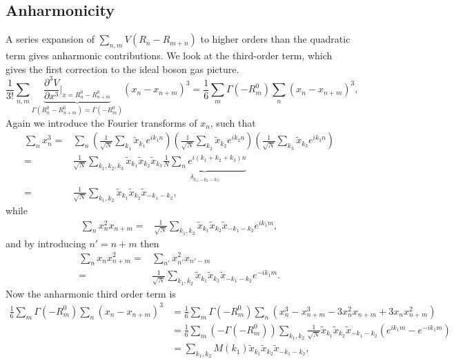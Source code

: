 \subsection{Anharmonicity}
A series expansion of $\sum_{n,m}V(R_{n}-R_{m+n})$ to higher orders than the quadratic term gives anharmonic contributions. We look at the third-order term, which gives the first correction to the ideal boson gas picture.
\[\frac{1}{3!}\sum_{n,m}\underbrace{\frac{\partial^{3}V}{\partial x^{3}}\Bigg|_{x=R_{n}^{0}-R_{n+m}^{0}}}_{\Gamma(R_{n}^{0}-R_{n+m}^{0})=\Gamma(-R_{m}^{0})}\left(x_{n}-x_{n+m}\right)^{3}=\frac{1}{6}\sum_{m}\Gamma(-R_{m}^{0})\sum_{n}\left(x_{n}-x_{n+m}\right)^{3},\]
Again we introduce the Fourier transforms of $x_{n}$, such that
\begin{align}
	\sum_{n}x_{n}^{3}=&\sum_{n}\left(\frac{1}{\sqrt{N}}\sum_{k_{1}}\tilde{x}_{k_{1}}e^{ik_{1}n}\right)\left(\frac{1}{\sqrt{N}}\sum_{k_{2}}\tilde{x}_{k_{2}}e^{ik_{2}n}\right)\left(\frac{1}{\sqrt{N}}\sum_{k_{3}}\tilde{x}_{k_{3}}e^{ik_{3}n}\right)\nonumber\\
	=&\frac{1}{\sqrt{N}}\sum_{k_{1},k_{2},k_{3}}\tilde{x}_{k_{1}}\tilde{x}_{k_{2}}\tilde{x}_{k_{3}}\underbrace{\frac{1}{N}\sum_{n}e^{i(k_{1}+k_{2}+k_{3})n}}_{\delta_{k_{1},-k_{2}-k_{3}}}\nonumber \\
	=&\frac{1}{\sqrt{N}}\sum_{k_{1},k_{2}}\tilde{x}_{k_{1}}\tilde{x}_{k_{2}}\tilde{x}_{-k_{1}-k_{2}}\nonumber,
\end{align}
while
\begin{align}
\sum_{n}x_{n}^{2}x_{n+m}=&\frac{1}{\sqrt{N}}\sum_{k_{1},k_{2}}\tilde{x}_{k_{1}}\tilde{x}_{k_{2}}\tilde{x}_{-k_{1}-k_{2}}e^{ik_{1}m},\nonumber
\end{align}
and by introducing $n'=n+m$ then
\begin{align}
	\sum_{n}x_{n}x_{n+m}^{2}=&\sum_{n'}x_{n'}^{2}x_{n'-m} \nonumber \\
	=&\frac{1}{\sqrt{N}}\sum_{k_{1},k_{2}}\tilde{x}_{k_{1}}\tilde{x}_{k_{2}}\tilde{x}_{-k_{1}-k_{2}}e^{-ik_{1}m}.\nonumber
\end{align}
Now the anharmonic third order term is
\begin{align}
	\frac{1}{6}\sum_{m}\Gamma(-R_{m}^{0})\sum_{n}(x_{n}-x_{n+m})^{3}&=\frac{1}{6}\sum_{m}\Gamma(-R_{m}^{0})\sum_{n}(x_{n}^{3}-x_{n+m}^{3}-3x_{n}^{2}x_{n+m}+3x_{n}x_{n+m}^{2})\nonumber \\ 
	&=\frac{1}{6}\sum_{m}\left(-\Gamma(-R_{m}^{0})\right)\sum_{k_{1},k_{2}}\frac{1}{\sqrt{N}}\tilde{x}_{k_{1}}\tilde{x}_{k_{2}}\tilde{x}_{-k_{1}-k_{2}}\left(e^{ik_{1}m}-e^{-ik_{1}m}\right)\nonumber\\
	&=\sum_{k_{1},k_{2}}M(k_{1})\tilde{x}_{k_{1}}\tilde{x}_{k_{2}}\tilde{x}_{-k_{1}-k_{2}},\nonumber \\
\end{align}

